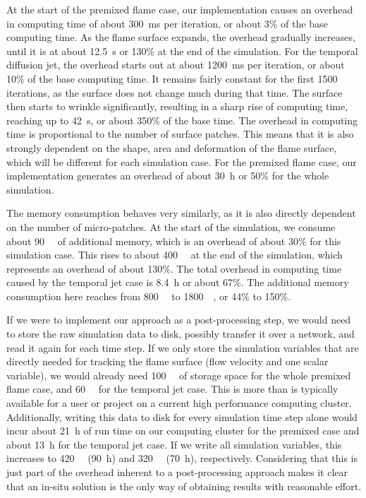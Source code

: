 %
At the start of the premixed flame case, our implementation causes an overhead
in computing time of about \SI{300}{\milli\second} per iteration, or about 3\%
of the base computing time.
%
As the flame surface expands, the overhead gradually increases, until it is at
about \SI{12.5}{\second} or 130\% at the end of the simulation.
%
For the temporal diffusion jet, the overhead starts out at about
\SI{1200}{\milli\second} per iteration, or about 10\% of the base
computing time.
%
It remains fairly constant for the first \num{1500} iterations, as the surface
does not change much during that time.
%
The surface then starts to wrinkle significantly, resulting in a sharp rise of
computing time, reaching up to \SI{42}{\second}, or about 350\% of the base
time.
%
The overhead in computing time is proportional to the number of surface patches.
%
This means that it is also strongly dependent on the shape, area and deformation
of the flame surface, which will be different for each simulation case.
%
For the premixed flame case, our implementation generates an overhead of about
\SI{30}{\hour} or 50\% for the whole simulation.
%

%
The memory consumption behaves very similarly, as it is also directly dependent
on the number of micro-patches.
%
At the start of the simulation, we consume about \SI{90}{\giga\byte} of
additional memory, which is an overhead of about 30\% for this simulation case.
%
This rises to about \SI{400}{\giga\byte} at the end of the simulation, which
represents an overhead of about 130\%.
%
The total overhead in computing time caused by the temporal jet case is
\SI{8.4}{\hour} or about 67\%.
%
The additional memory consumption here reaches from \SI{800}{\giga\byte} to
\SI{1800}{\giga\byte}, or 44\% to 150\%.
%

%
If we were to implement our approach as a post-processing step, we would need to
store the raw simulation data to disk, possibly transfer it over a network, and
read it again for each time step.
%
If we only store the simulation variables that are directly needed for tracking
the flame surface (flow velocity and one scalar variable), we would already need
\SI{100}{\tera\byte} of storage space for the whole premixed flame case, and
\SI{60}{\tera\byte} for the temporal jet case.
%
This is more than is typically available for a user or project on a current high
performance computing cluster.
%
Additionally, writing this data to disk for every simulation time step alone
would incur about \SI{21}{\hour} of run time on our computing cluster for the
premixed case and about \SI{13}{\hour} for the temporal jet case.
%
If we write all simulation variables, this increases to \SI{420}{\tera\byte}
(\SI{90}{\hour}) and \SI{320}{\tera\byte} (\SI{70}{\hour}), respectively.
%
Considering that this is just part of the overhead inherent to a post-processing
approach makes it clear that an in-situ solution is the only way of obtaining
results with reasonable effort.
%

%
